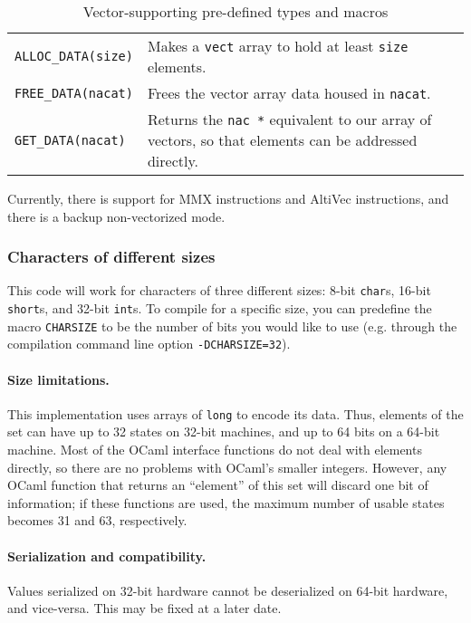 \documentclass{article}
\begin{document}
\begin{table}
\begin{tabular}{lp{250pt}}
    \texttt{ALLOC\_DATA(size)} & Makes a \texttt{vect} array to hold at least
    \texttt{size} elements. \\

    \texttt{FREE\_DATA(nacat)} & Frees the vector array data housed in
    \texttt{nacat}. \\

    \texttt{GET\_DATA(nacat)} & Returns the \texttt{nac *} equivalent to our
    array of vectors, so that elements can be addressed directly. \\
    \hline
  \end{tabular}
  \caption{Vector-supporting pre-defined types and macros}
  \label{tab:macros}
\end{table}
Currently, there is support for MMX instructions and AltiVec instructions, and
there is a backup non-vectorized mode.


\subsubsection*{Characters of different sizes}
This code will work for characters of three different sizes:  8-bit
\texttt{char}s, 16-bit \texttt{short}s, and 32-bit \texttt{int}s.  To compile
for a specific size, you can predefine the macro \texttt{CHARSIZE} to be the
number of bits you would like to use (e.g. through the compilation command line
option \texttt{-DCHARSIZE=32}).

\paragraph{Size limitations.}
This implementation uses arrays of \texttt{long} to encode its data.  Thus,
elements of the set can have up to 32 states on 32-bit machines, and up to 64
bits on a 64-bit machine.  Most of the OCaml interface functions do not deal
with elements directly, so there are no problems with OCaml's smaller integers.
However, any OCaml function that returns an ``element'' of this set will discard
one bit of information; if these functions are used, the maximum number of
usable states becomes 31 and 63, respectively.



\paragraph{Serialization and compatibility.}
Values serialized on 32-bit hardware cannot be deserialized on 64-bit hardware,
and vice-versa.  This may be fixed at a later date.
\end{document}
